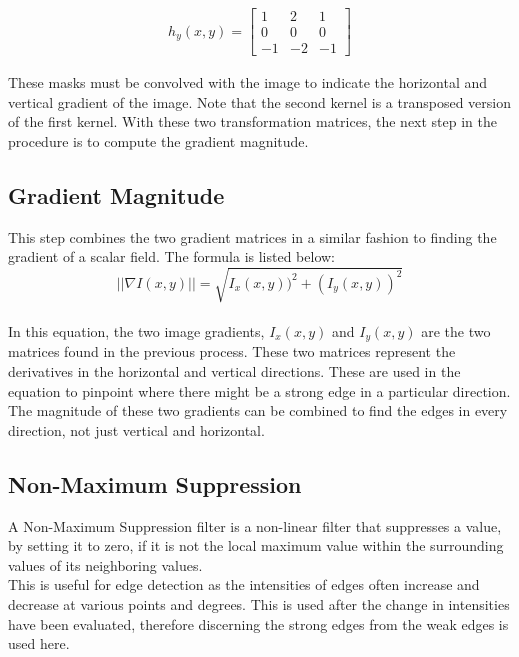 \documentclass{article}
\begin{document}
	\begin{align*}
		h_{y}(x,y) = \left[
		\begin{matrix}
			 1 & 2 & 1\\
			 0 & 0 & 0\\
			-1 & -2 & -1
		\end{matrix}
		\right]
	\end{align*}
	
	These masks must be convolved with the image to indicate the horizontal and vertical gradient of the image. Note that the second kernel is a transposed version of the first kernel. With these two transformation matrices, the next step in the procedure is to compute the gradient magnitude.
	
	\subsection{Gradient Magnitude}
	
	This step combines the two gradient matrices in a similar fashion to finding the gradient of a scalar field. The formula is listed below:\\
	
	\begin{equation}
		||\nabla I(x,y)|| = \sqrt{I_{x}(x,y))^2 + (I_{y}(x,y))^2}
	\end{equation}\\
	
	In this equation, the two image gradients, $I_{x}(x,y)$ and $ I_{y}(x,y)$ are the two matrices found in the previous process. These two matrices represent the derivatives in the horizontal and vertical directions. These are used in the equation to pinpoint where there might be a strong edge in a particular direction. The magnitude of these two gradients can be combined to find the edges in every direction, not just vertical and horizontal.
	
	\subsection{Non-Maximum Suppression}
	
	 A Non-Maximum Suppression filter is a non-linear filter that suppresses a value, by setting it to zero, if it is not the local maximum value within the surrounding values of its neighboring values.\\
	 
	 This is useful for edge detection as the intensities of edges often increase and decrease at various points and degrees. This is used after the change in intensities have been evaluated, therefore discerning the strong edges from the weak edges is used here.\\
	 
\end{document}
